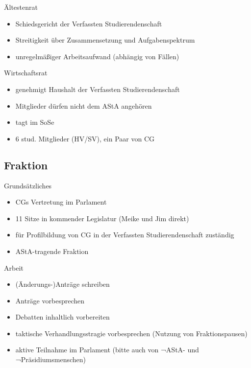 \documentclass{beamer}
\begin{document}
\begin{frame}{Ältestenrat}
    \begin{itemize}
        \item Schiedsgericht der Verfassten Studierendenschaft
        \item Streitigkeit über Zusammensetzung und Aufgabenspektrum
        \item unregelmäßiger Arbeitsaufwand (abhängig von Fällen)
    \end{itemize}
\end{frame}

\begin{frame}{Wirtschaftsrat}
    \begin{itemize}
        \item genehmigt Haushalt der Verfassten Studierendenschaft
        \item Mitglieder dürfen nicht dem AStA angehören
        \item tagt im SoSe
        \item 6 stud. Mitglieder (HV/SV), ein Paar von CG
    \end{itemize}
\end{frame}

\subsection{Fraktion}

\begin{frame}{Grundsätzliches}
    \begin{itemize}
        \item CGs Vertretung im Parlament
        \item 11 Sitze in kommender Legislatur (Meike und Jim direkt)
        \item für Profilbildung von CG in der Verfassten Studierendenschaft zuständig
        \item AStA-tragende Fraktion
    \end{itemize}
\end{frame}

\begin{frame}{Arbeit}
    \begin{itemize}
        \item (Änderungs-)Anträge schreiben
        \item Anträge vorbesprechen
        \item Debatten inhaltlich vorbereiten
        \item taktische Verhandlungsstragie vorbesprechen (Nutzung von Fraktionspausen)
        \item aktive Teilnahme im Parlament (bitte auch von ¬AStA- und ¬Präsidiumsmenschen)
    \end{itemize}
\end{frame}
\end{document}
